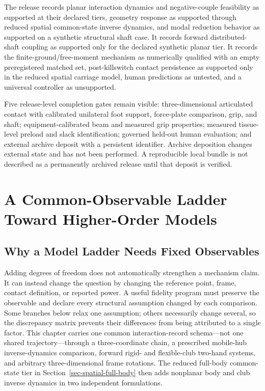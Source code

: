 \documentclass[
  letterpaper,
]{report}
\begin{document}
The release records planar interaction dynamics and negative-couple
feasibility as supported at their declared tiers, geometry response as
supported through reduced spatial common-state inverse dynamics, and
modal reduction behavior as supported on a synthetic structural shaft
case. It records forward distributed-shaft coupling as supported only
for the declared synthetic planar tier. It records the
finite-ground/free-moment mechanism as numerically qualified with an
empty preregistered matched set, post-killswitch contact persistence as
supported only in the reduced spatial carriage model, human predictions
as untested, and a universal controller as unsupported.

Five release-level completion gates remain visible: three-dimensional
articulated contact with calibrated unilateral foot support, force-plate
comparison, grip, and shaft; equipment-calibrated beam and measured grip
properties; measured tissue-level preload and slack identification;
governed held-out human evaluation; and external archive deposit with a
persistent identifier. Archive deposition changes external state and has
not been performed. A reproducible local bundle is not described as a
permanently archived release until that deposit is verified.

\chapter{A Common-Observable Ladder Toward Higher-Order
Models}\label{sec-model-ladder}

\section{Why a Model Ladder Needs Fixed
Observables}\label{sec-ladder-question}

Adding degrees of freedom does not automatically strengthen a mechanism
claim. It can instead change the question by changing the reference
point, frame, contact definition, or reported power. A useful fidelity
program must preserve the observable and declare every structural
assumption changed by each comparison. Some branches below relax one
assumption; others necessarily change several, so the discrepancy matrix
prevents their differences from being attributed to a single factor.
This chapter carries one common interaction-record schema---not one
shared trajectory---through a three-coordinate chain, a prescribed
mobile-hub inverse-dynamics comparison, forward rigid- and flexible-club
two-hand systems, and arbitrary three-dimensional frame rotations. The
reduced full-body common-state tier in
Section~\ref{sec-spatial-full-body} then adds nonplanar body and club
inverse dynamics in two independent formulations.
\end{document}
